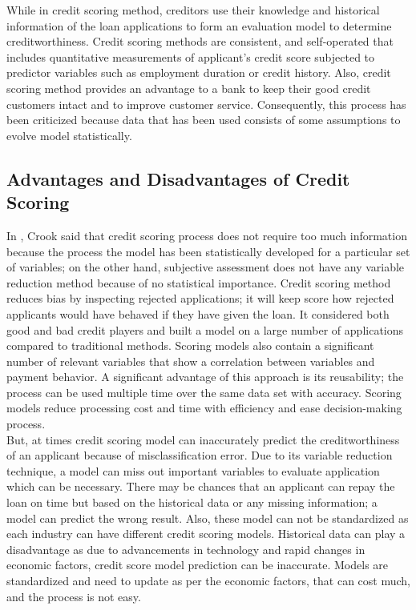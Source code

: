{While in credit scoring method, creditors use their knowledge and historical information of the loan applications to form an evaluation model to determine creditworthiness. Credit scoring methods are consistent, and self-operated that includes quantitative measurements of applicant's credit score subjected to predictor variables such as employment duration or credit history. Also, credit scoring method provides an advantage to a bank to keep their good credit customers intact and to improve customer service. Consequently, this process has been criticized because data that has been used consists of some assumptions to evolve model statistically.\\

\subsection{Advantages and Disadvantages of Credit Scoring}
In \citep{crook1996credit}, Crook said that credit scoring process does not require too much information because the process the model has been statistically developed for a particular set of variables; on the other hand, subjective assessment does not have any variable reduction method because of no statistical importance. Credit scoring method reduces bias by inspecting rejected applications; it will keep score how rejected applicants would have behaved if they have given the loan. It considered both good and bad credit players and built a model on a large number of applications compared to traditional methods. Scoring models also contain a significant number of relevant variables that show a correlation between variables and payment behavior. A significant advantage of this approach is its reusability; the process can be used multiple time over the same data set with accuracy. Scoring models reduce processing cost and time with efficiency and ease decision-making process.\\

But, at times credit scoring model can inaccurately predict the creditworthiness of an applicant because of misclassification error. Due to its variable reduction technique, a model can miss out important variables to evaluate application which can be necessary. There may be chances that an applicant can repay the loan on time but based on the historical data or any missing information; a model can predict the wrong result. Also, these model can not be standardized as each industry can have different credit scoring models. Historical data can play a disadvantage as due to advancements in technology and rapid changes in economic factors, credit score model prediction can be inaccurate. Models are standardized and need to update as per the economic factors, that can cost much, and the process is not easy. 

}

